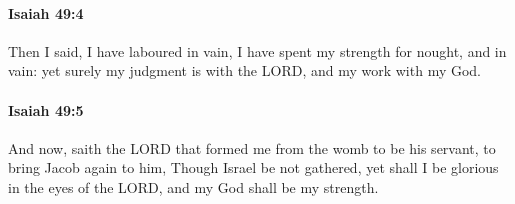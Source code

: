 		\paragraph{Isaiah 49:4} %
			\label{ISAIAH-49-4}

			Then I said, I have laboured in vain, I have spent my strength for nought, and in vain: yet surely my judgment is with the LORD, and my work with my God.


		\paragraph{Isaiah 49:5} %
			\label{ISAIAH-49-5}

			And now, saith the LORD that formed me from the womb to be his servant, to bring Jacob again to him, Though Israel be not gathered, yet shall I be glorious in the eyes of the LORD, and my God shall be my strength.


